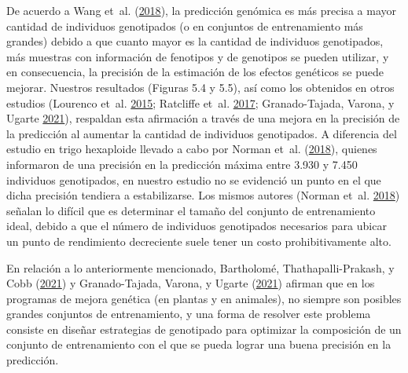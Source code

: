 \documentclass[11pt,spanish,a4paper,oneside,]{book} %
\begin{document}
De acuerdo a Wang et~al. (\protect\hyperlink{ref-cite:77}{2018}), la predicción genómica es más precisa a mayor cantidad de individuos genotipados (o en conjuntos de entrenamiento más grandes) debido a que cuanto mayor es la cantidad de individuos genotipados, más muestras con información de fenotipos y de genotipos se pueden utilizar, y en consecuencia, la precisión de la estimación de los efectos genéticos se puede mejorar. Nuestros resultados (Figuras 5.4 y 5.5), así como los obtenidos en otros estudios (Lourenco et~al. \protect\hyperlink{ref-cite:87}{2015}; Ratcliffe et~al. \protect\hyperlink{ref-cite:72}{2017}; Granado-Tajada, Varona, y Ugarte \protect\hyperlink{ref-cite:88}{2021}), respaldan esta afirmación a través de una mejora en la precisión de la predicción al aumentar la cantidad de individuos genotipados. A diferencia del estudio en trigo hexaploide llevado a cabo por Norman et~al. (\protect\hyperlink{ref-cite:78}{2018}), quienes informaron de una precisión en la predicción máxima entre 3.930 y 7.450 individuos genotipados, en nuestro estudio no se evidenció un punto en el que dicha precisión tendiera a estabilizarse. Los mismos autores (Norman et~al. \protect\hyperlink{ref-cite:78}{2018}) señalan lo difícil que es determinar el tamaño del conjunto de entrenamiento ideal, debido a que el número de individuos genotipados necesarios para ubicar un punto de rendimiento decreciente suele tener un costo prohibitivamente alto.

En relación a lo anteriormente mencionado, Bartholomé, Thathapalli-Prakash, y Cobb (\protect\hyperlink{ref-cite:58}{2021}) y Granado-Tajada, Varona, y Ugarte (\protect\hyperlink{ref-cite:88}{2021}) afirman que en los programas de mejora genética (en plantas y en animales), no siempre son posibles grandes conjuntos de entrenamiento, y una forma de resolver este problema consiste en diseñar estrategias de genotipado para optimizar la composición de un conjunto de entrenamiento con el que se pueda lograr una buena precisión en la predicción.
\end{document}
